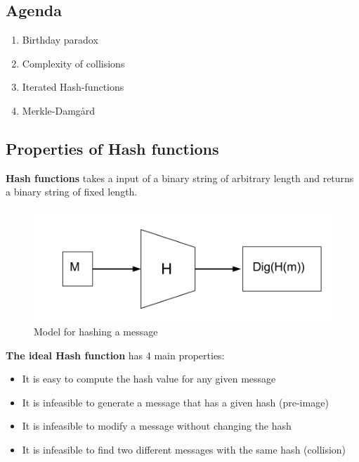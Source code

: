 

\subsection*{Agenda}
\begin{enumerate}
\item Birthday paradox
\item Complexity of collisions
\item Iterated Hash-functions
\item Merkle-Damgård
\end{enumerate}

\subsection{Properties of Hash functions}

\textbf{Hash functions} takes a input of a binary string of arbitrary
length and returns a binary string of fixed length.
\begin{figure}[H]
  \centering
  \includegraphics[scale=0.4]{images/10-hash}
  \caption{Model for hashing a message}
\end{figure}

\textbf{The ideal Hash function} has 4 main properties:
\begin{itemize}
\item It is easy to compute the hash value for any given message
\item It is infeasible to generate a message that has a given hash (pre-image)
\item It is infeasible to modify a message without changing the hash
\item It is infeasible to find two different messages with the same hash (collision)
\end{itemize}

